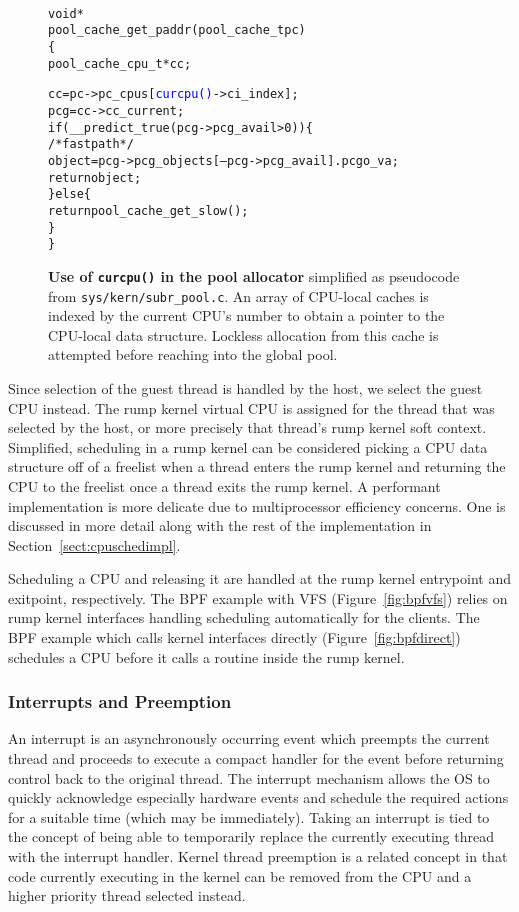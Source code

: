 \begin{figure}[t]
{\tt \scriptsize
\begin{alltt}
void *
pool_cache_get_paddr(pool_cache_t pc)
\{
    pool_cache_cpu_t *cc;

    cc = pc->pc_cpus[\textcolor{blue}{curcpu()}->ci_index];
    pcg = cc->cc_current;
    if (__predict_true(pcg->pcg_avail > 0)) \{
            /* fastpath */
            object = pcg->pcg_objects[--pcg->pcg_avail].pcgo_va;
            return object;
    \} else \{
            return pool_cache_get_slow();
    \}
\}
\end{alltt}}
\caption[Use of \texttt{curcpu()} in the pool allocator]
{\textbf{Use of \texttt{curcpu()} in the pool allocator}
simplified as pseudocode from \texttt{sys/kern/subr\_pool.c}.
An array of CPU-local caches is indexed by the current CPU's number to
obtain a pointer to the CPU-local data structure.  Lockless allocation
from this cache is attempted before reaching into the global pool.
}
\label{fig:curcpu}
\end{figure}

Since selection of the guest thread is handled by the host, we select the
guest CPU instead.  The rump kernel virtual CPU is assigned for the thread
that was selected by the host, or more precisely that thread's rump kernel
soft context.  Simplified, scheduling in a rump kernel can be considered
picking a CPU data structure off of a freelist when a thread enters the
rump kernel and returning the CPU to the freelist once a thread exits
the rump kernel.  A performant implementation is more delicate due to
multiprocessor efficiency concerns.  One is discussed in more detail along
with the rest of the implementation in Section~\ref{sect:cpuschedimpl}.

Scheduling a CPU and releasing it are handled at the rump kernel
entrypoint and exitpoint, respectively.  The BPF example with VFS
(Figure~\ref{fig:bpfvfs}) relies on rump kernel interfaces handling
scheduling automatically for the clients.  The BPF example which calls
kernel interfaces directly (Figure~\ref{fig:bpfdirect}) schedules a CPU
before it calls a routine inside the rump kernel.

\subsubsection{Interrupts and Preemption}
\label{sect:preempt}

An interrupt is an asynchronously occurring event which preempts
the current thread and proceeds to execute a compact handler for
the event before returning control back to the original thread.
The interrupt mechanism allows the OS to quickly acknowledge especially
hardware events and schedule the required actions for a suitable time
(which may be immediately).  Taking an interrupt is tied to the concept
of being able to temporarily replace the currently executing thread with
the interrupt handler.  Kernel thread preemption is a related concept
in that code currently executing in the kernel can be removed from
the CPU and a higher priority thread selected instead.

